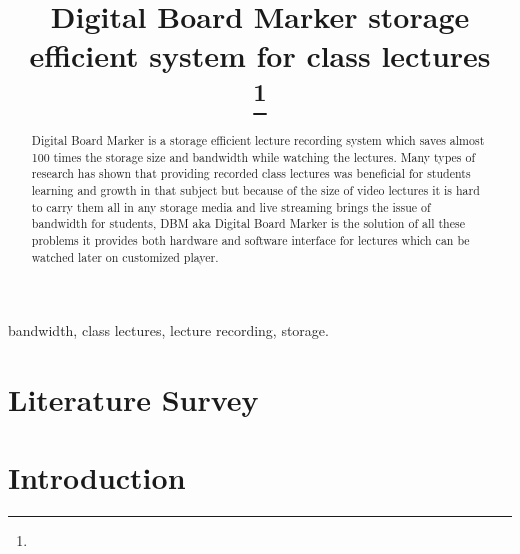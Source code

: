 \documentclass[conference]{IEEEtran}
\begin{document}
\title{Digital Board Marker storage efficient system for class lectures \\
{\footnotesize }
\thanks{}
}

\author{
\and
{}
\and
{}
}

\maketitle

\begin{abstract}Digital Board Marker is a storage efficient lecture recording system which saves almost 100 times the storage size and bandwidth while watching the lectures. Many types of research has shown that providing recorded class lectures was beneficial for students learning and growth in that subject but because of the size of video lectures it is hard to carry them all in any storage media and live streaming brings the issue of bandwidth for students, DBM aka Digital Board Marker is the solution of all these problems it provides both hardware and software interface for lectures which can be watched later on customized player.
\end{abstract}

\begin{IEEEkeywords}
bandwidth, class lectures, lecture recording, storage.
\end{IEEEkeywords}
\section{Literature Survey}

\section{Introduction}
\end{document}
